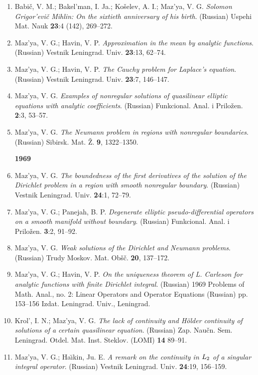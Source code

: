 \documentclass{article}
\begin{document}
\begin{enumerate}
{\bf 1968}
\item Babi\v c, V. M.; Bakel'man, I. Ja.; Ko\v selev, A. I.; Maz'ya,
V. G.
{\it Solomon Grigor'evi\v c Mihlin: On the
sixtieth anniversary of his birth}. (Russian) Uspehi Mat. Nauk {\bf
23}:4
(142), 269--272.
\item Maz'ya, V. G.; Havin, V. P. {\it Approximation in the mean by
analytic functions}. (Russian) Vestnik
Leningrad. Univ. {\bf 23}:13, 62--74.
\item Maz'ya, V. G.; Havin, V. P. {\it The Cauchy problem for
Laplace's
equation}. (Russian) Vestnik Leningrad.
Univ. {\bf 23}:7, 146--147.
\item Maz'ya, V. G. {\it Examples of nonregular solutions of
quasilinear
elliptic equations with analytic coefficients}.
(Russian) Funkcional. Anal. i Prilo\v zen. {\bf 2}:3, 53--57.
\item Maz'ya, V. G. {\it The Neumann problem in regions with
nonregular
boundaries}. (Russian) Sibirsk.
Mat. \v Z. {\bf 9}, 1322--1350.\hfill\break

{\bf 1969}
\item Maz'ya, V. G. {\it The boundedness of the first derivatives of
the
solution of the Dirichlet problem in a region with smooth
nonregular boundary}. (Russian) Vestnik Leningrad. Univ. {\bf 24}:1,
72--79.
\item Maz'ya, V. G.; Panejah, B. P. {\it Degenerate elliptic
pseudo-differential operators on a smooth manifold
without boundary}. (Russian) Funkcional. Anal. i Prilo\v zen. {\bf
3}:2,
91--92.
\item Maz'ya, V. G. {\it Weak solutions of the Dirichlet and Neumann
problems}. (Russian) Trudy Moskov. Mat. Ob\v s\v c. {\bf 20},
137--172.
\item Maz'ya, V. G.; Havin, V. P. {\it On the uniqueness theorem of L.
Carleson for analytic functions with
finite Dirichlet integral}. (Russian) 1969 Problems of Math. Anal.,
no. 2:
Linear Operators and Operator Equations (Russian) pp.
153--156 Izdat. Leningrad. Univ., Leningrad.
\item Krol', I. N.; Maz'ya, V. G. {\it The lack of continuity and
H\"older
continuity of solutions of a certain
quasilinear equation}. (Russian) Zap. Nau\v cn. Sem. Leningrad. Otdel.
Mat.
Inst. Steklov. (LOMI) {\bf 14} 89--91.
\item Maz'ya, V. G.; Ha{\u\i}kin, Ju. E. {\it A remark on the
continuity in
$L\sb{2}$ of a singular
integral operator}. (Russian) Vestnik Leningrad. Univ. {\bf 24}:19,
156--159.\hfill\break


\end{enumerate}
\end{document}
